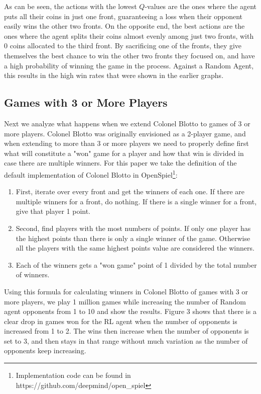 \documentclass[11pt, oneside]{article}   	%
\begin{document}
\hfill

As can be seen, the actions with the lowest $Q$-values are the ones where the agent puts all their coins in just one front, guaranteeing a loss when their opponent easily wins the other two fronts. On the opposite end, the best actions are the ones where the agent splits their coins almost evenly among just two fronts, with 0 coins allocated to the third front. By sacrificing one of the fronts, they give themselves the best chance to win the other two fronts they focused on, and have a high probability of winning the game in the process. Against a Random Agent, this results in the high win rates that were shown in the earlier graphs.

\subsection{Games with 3 or More Players}

Next we analyze what happens when we extend Colonel Blotto to games of 3 or more players. Colonel Blotto was originally envisioned as a 2-player game, and when extending to more than 3 or more players we need to properly define first what will constitute a "won" game for a player and how that win is divided in case there are multiple winners. For this paper we take the definition of the default implementation of Colonel Blotto in OpenSpiel\footnote{Implementation code can be found in https://github.com/deepmind/open\_spiel}:

\begin{enumerate}
  \item First, iterate over every front and get the winners of each one. If there are multiple winners for a front, do nothing. If there is a single winner for a front, give that player 1 point.
  \item Second, find players with the most numbers of points. If only one player has the highest points than there is only a single winner of the game. Otherwise all the players with the same highest points value are considered the winners.
  \item Each of the winners gets a "won game" point of 1 divided by the total number of winners.
\end{enumerate}

\hfill

Using this formula for calculating winners in Colonel Blotto of games with 3 or more players, we play 1 million games while increasing the number of Random agent opponents from 1 to 10 and show the results. Figure 3 shows that there is a clear drop in games won for the RL agent when the number of opponents is increased from 1 to 2. The wins then increase when the number of opponents is set to 3, and then stays in that range without much variation as the number of opponents keep increasing. 
\end{document}
